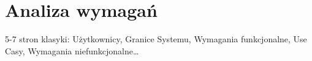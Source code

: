 \chapter{Analiza wymagań}
\label{cha:srs}
5-7 stron klasyki: Użytkownicy, Granice Systemu, Wymagania funkcjonalne, Use Casy, Wymagania niefunkcjonalne…